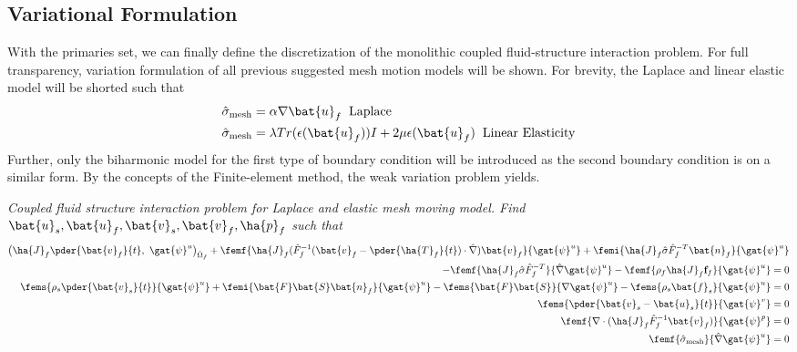 \subsection{Variational Formulation}
With the primaries set, we can finally define the discretization of the monolithic coupled fluid-structure interaction problem. For full transparency, variation formulation of all previous suggested mesh motion models will be shown. For brevity, the Laplace and linear elastic model will be shorted such that 
\begin{align*}
&\hat{\sigma}_{\text{mesh}} = \alpha \nabla \bat{u}_f \hspace{2mm} \text{Laplace} \\
&\hat{\sigma}_{\text{mesh}} =  \lambda Tr(\epsilon(\bat{u}_f)) I + 2 \mu \epsilon(\bat{u}_f) \hspace{2mm} \text{Linear Elasticity} 
\end{align*}
Further, only the biharmonic model for the first type of boundary condition will be introduced as the second boundary condition is on a similar form.
  By the concepts of the Finite-element method, the weak variation problem yields.
\begin{prob}
\textit{Coupled fluid structure interaction problem for Laplace and elastic mesh moving model.
Find $\bat{u}_s, \bat{u}_f, \bat{v}_s, \bat{v}_f, \ha{p}_f $ such that}
\begin{align*}
\big(\ha{J}_f \pder{\bat{v}_f}{t}, \ \gat{\psi}^u \big)_{\hat{\Omega}_f} +
\femf{\ha{J}_f (\hat{F}_f^{-1}(\bat{v}_f - \pder{\ha{T}_f}{t}) \cdot \hat{\nabla}) \bat{v}_f}{\gat{\psi}^u}
+ \femi{\ha{J}_f \hat{\sigma}\hat{F}_f^{-T} \bat{n}_f}{\gat{\psi}^u} \\
- \femf{\ha{J}_f \hat{\sigma}\hat{F}_f^{-T}}{\hat{\nabla}\gat{\psi}^u} -
\femf{\rho_f \ha{J}_f \mathbf{f}_f}{{\gat{\psi}^u}} = 0 \\
\fems{\rho_s \pder{\bat{v}_s}{t}}{\gat{\psi}^u} + \femi{\bat{F}\bat{S}\bat{n}_f}{\gat{\psi}^u}
- \fems{\bat{F}\bat{S}}{\nabla \gat{\psi}^u} - \fems{\rho_s \bat{f}_s}{\gat{\psi}^u} = 0 \\
\fems{\pder{\bat{v}_s - \bat{u}_s}{t}}{\gat{\psi}^v}  = 0\\
\femf{\nabla \cdot (\ha{J}_f \hat{F}_f^{-1} \bat{v}_f)}{\gat{\psi}^p} = 0 \\
\femf{\hat{\sigma}_{\text{mesh}}}{\hat{\nabla}\gat{\psi}^u} = 0
\end{align*} 
\end{prob}
